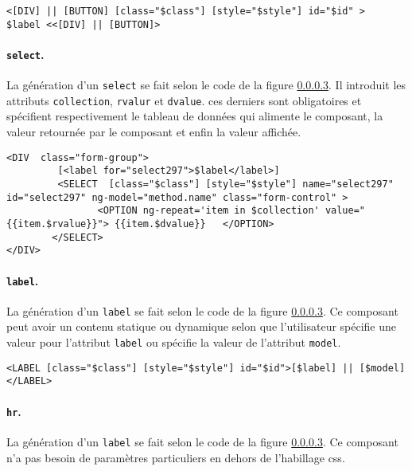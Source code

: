 \documentclass[a4paper,11pt]{report}
\begin{document}
\begin{verbatim}
<[DIV] || [BUTTON] [class="$class"] [style="$style"] id="$id" >  $label <<[DIV] || [BUTTON]>
\end{verbatim}

\paragraph{{\tt select}.} La génération d'un {\tt select} se fait selon le code de la figure \ref{}. Il introduit les attributs {\tt collection}, {\tt rvalur}
et {\tt dvalue}. ces derniers sont obligatoires et spécifient  respectivement le tableau de données qui alimente le composant, la valeur retournée 
par le composant et enfin la valeur affichée. 

\begin{verbatim}
<DIV  class="form-group">
    	 [<label for="select297">$label</label>]
         <SELECT  [class="$class"] [style="$style"] name="select297" id="select297" ng-model="method.name" class="form-control" >
         		<OPTION ng-repeat='item in $collection' value="{{item.$rvalue}}"> {{item.$dvalue}} 	 </OPTION>
        </SELECT>
</DIV>
\end{verbatim} 

\paragraph{{\tt label}.} La génération d'un {\tt label} se fait selon le code de la figure \ref{}. Ce composant peut avoir un contenu
statique ou dynamique selon que l'utilisateur spécifie une valeur pour l'attribut {\tt label} ou spécifie la valeur de l'attribut {\tt model}.

\begin{verbatim}
<LABEL [class="$class"] [style="$style"] id="$id">[$label] || [$model] </LABEL>
\end{verbatim}
\paragraph{{\tt hr}.} La génération d'un {\tt label} se fait selon le code de la figure \ref{}. Ce composant n'a pas besoin de paramètres
particuliers en dehors de l'habillage css.
\end{document}
